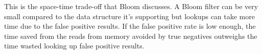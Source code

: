 This is the space-time trade-off that Bloom discusses. A Bloom filter can be
very small compared to the data structure it's supporting but lookups can take
more time due to the false positive results. If the false positive rate is low
enough, the time saved from the reads from memory avoided by true negatives
outweighs the time wasted looking up false positive results.

